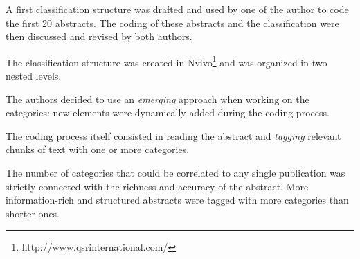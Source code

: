 A first classification structure was drafted and used by one of the author to code the first 20 abstracts. The coding of these abstracts and the classification were then discussed and revised by both authors.

The classification structure was created in Nvivo\footnote{http://www.qsrinternational.com/} and was organized in two nested levels.

The authors decided to use an \textit{emerging} approach when working on the categories: new elements were dynamically added during the coding process.

The coding process itself consisted in reading the abstract and \textit{tagging} relevant chunks of text with one or more categories.

The number of categories that could be correlated to any single publication was strictly connected with the richness and accuracy of the abstract. More information-rich and structured abstracts were tagged with more categories than shorter ones.